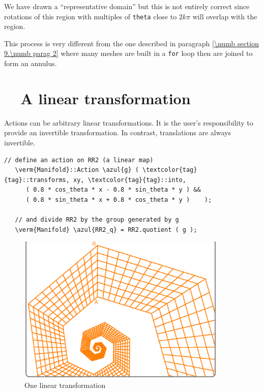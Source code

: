 We have drawn a ``representative domain'' but this is not entirely correct since
rotations of this region with multiples of {\small\tt theta} close to $ 2k\pi $
will overlap with the region.

This process is very different from the one described in paragraph
\ref{\numb section 9.\numb parag 2}
where many meshes are built in a {\small\tt for} loop then are joined to form an annulus.


\section{~~A linear transformation}\label{\numb section 7.\numb parag 12}

Actions can be arbitrary linear transformations.
It is the user's responsibility to provide an invertible transformation.
In contrast, translations are always invertible.

\begin{Verbatim}[commandchars=\\\{\},formatcom=\small\tt,frame=single,
   label=parag-\ref{\numb section 7.\numb parag 12}.cpp,rulecolor=\color{coment},
   baselinestretch=0.94,framesep=2mm                                             ]
   // define an action on RR2 (a linear map)
   \verm{Manifold}::Action \azul{g} ( \textcolor{tag}{tag}::transforms, xy, \textcolor{tag}{tag}::into,
      ( 0.8 * cos_theta * x - 0.8 * sin_theta * y ) &&
      ( 0.8 * sin_theta * x + 0.8 * cos_theta * y )    );

   // and divide RR2 by the group generated by g
   \verm{Manifold} \azul{RR2_q} = RR2.quotient ( g );
\end{Verbatim}

\begin{figure}[ht] \centering
  \includegraphics[width=100mm]{sector-2.eps}
  \caption{One linear transformation}
  \label{\numb section 7.\numb fig 8}
\end{figure}


